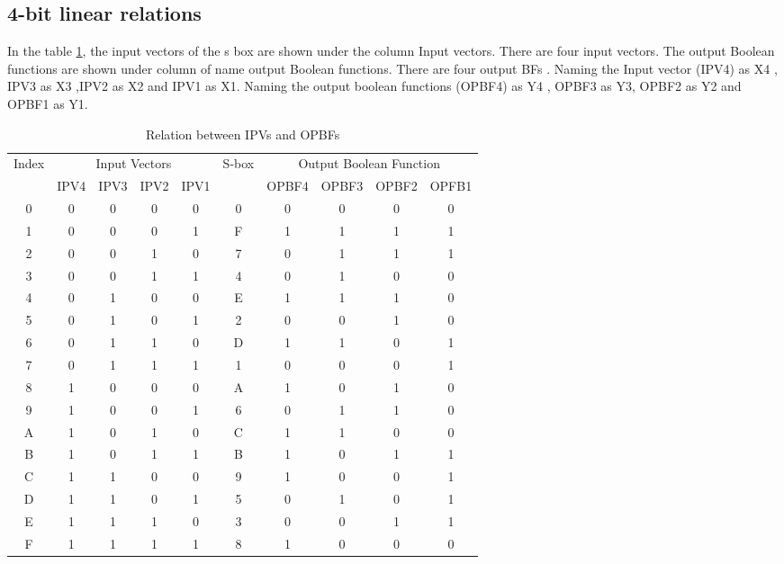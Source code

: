 \documentclass[12pt]{article}
\begin{document}
\subsection{4-bit linear relations}
In the table \ref{table:8}, the input vectors of the s box are shown under the column Input vectors. There are four input vectors. The output Boolean functions are shown under column of name output Boolean functions. There are four output BFs . Naming the Input vector (IPV4) as X4 ,  IPV3 as X3 ,IPV2 as X2 and IPV1 as X1. Naming the output boolean functions (OPBF4) as Y4 , OPBF3 as Y3, OPBF2 as Y2 and OPBF1 as Y1. 
\begin{table}[H]
    \centering
    \begin{tabular}{|c|c|c|c|c|c|c|c|c|c|}
        \hline
        \multirow{2}{*}{Index} & \multicolumn{4}{|c|}{Input Vectors} & \multirow{2}{*}{S-box} & \multicolumn{4}{|c|}{Output Boolean Function} \\
        & IPV4 & IPV3 & IPV2 & IPV1 & & OPBF4 & OPBF3 & OPBF2 & OPFB1 \\
        \hline
        0 & 0 & 0 & 0 & 0 & 0 & 0 & 0 & 0 & 0 \\
        \hline
        1 & 0 & 0 & 0 & 1 & F & 1 & 1 & 1 & 1 \\
        \hline
        2 & 0 & 0 & 1 & 0 & 7 & 0 & 1 & 1 & 1 \\
        \hline
        3 & 0 & 0 & 1 & 1 & 4 & 0 & 1 & 0 & 0 \\
        \hline
        4 & 0 & 1 & 0 & 0 & E & 1 & 1 & 1 & 0 \\
        \hline
        5 & 0 & 1 & 0 & 1 & 2 & 0 & 0 & 1 & 0 \\
        \hline
        6 & 0 & 1 & 1 & 0 & D & 1 & 1 & 0 & 1 \\
        \hline
        7 & 0 & 1 & 1 & 1 & 1 & 0 & 0 & 0 & 1 \\
        \hline
        8 & 1 & 0 & 0 & 0 & A & 1 & 0 & 1 & 0 \\
        \hline
        9 & 1 & 0 & 0 & 1 & 6 & 0 & 1 & 1 & 0 \\
        \hline
        A & 1 & 0 & 1 & 0 & C & 1 & 1 & 0 & 0 \\
        \hline
        B & 1 & 0 & 1 & 1 & B & 1 & 0 & 1 & 1 \\
        \hline
        C & 1 & 1 & 0 & 0 & 9 & 1 & 0 & 0 & 1 \\
        \hline
        D & 1 & 1 & 0 & 1 & 5 & 0 & 1 & 0 & 1 \\
        \hline
        E & 1 & 1 & 1 & 0 & 3 & 0 & 0 & 1 & 1 \\
        \hline
        F & 1 & 1 & 1 & 1 & 8 & 1 & 0 & 0 & 0 \\
        \hline
    \end{tabular}
    \caption{Relation between IPVs and OPBFs}
    \label{table:8}
\end{table}
\end{document}
